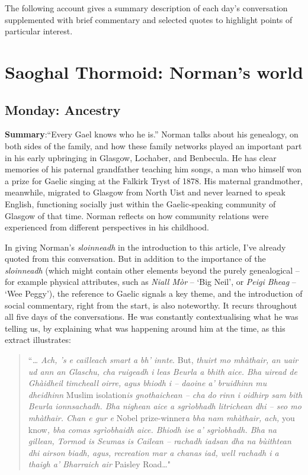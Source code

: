 \documentclass[output=paper,colorlinks,citecolor=brown]{langscibook}
\begin{document}
The following account gives a summary description of each day’s conversation supplemented with brief commentary and selected quotes to highlight points of particular interest. 


\section{Saoghal Thormoid: Norman’s world}


\subsection{Monday: Ancestry}

\textbf{Summary}:``Every Gael knows who he is.” Norman talks about his genealogy, on both sides of the family, and how these family networks played an important part in his early upbringing in Glasgow, Lochaber, and Benbecula. He has clear memories of his paternal grandfather teaching him songs, a man who himself won a prize for Gaelic singing at the Falkirk Tryst of 1878. His maternal grandmother, meanwhile, migrated to Glasgow from North Uist and never learned to speak English, functioning socially just within the Gaelic-speaking community of Glasgow of that time. Norman reflects on how community relations were experienced from different perspectives in his childhood.

In giving Norman’s \textit{sloinneadh} in the introduction to this article, I’ve already quoted from this conversation. But in addition to the importance of the \textit{sloinneadh} (which might contain other elements beyond the purely genealogical – for example physical attributes, such as \textit{Niall Mòr} – ‘Big Neil’, or \textit{Peigi Bheag} – ‘Wee Peggy’), the reference to Gaelic signals a key theme, and the introduction of social commentary, right from the start, is also noteworthy. It recurs throughout all five days of the conversations. He was constantly contextualising what he was telling us, by explaining what was happening around him at the time, as this extract illustrates:

\begin{quote}
``\textit{… Ach, ’s e cailleach smart a bh’ innte}. But, \textit{thuirt mo mhàthair, an uair ud ann an Glaschu, cha ruigeadh i leas Beurla a bhith aice. Bha uiread de Ghàidheil timcheall oirre, agus bhiodh i – daoine a’ bruidhinn mu dheidhinn} Muslim isolation\textit{is gnothaichean – cha do rinn i oidhirp sam bith Beurla ionnsachadh. Bha nighean aice a sgrìobhadh litrichean dhi – seo mo mhàthair. Chan e gur e} Nobel prize-winner\textit{a bha nam mhàthair, ach, }you know\textit{, bha comas sgrìobhaidh aice. Bhiodh ise a’ sgrìobhadh. Bha na gillean, Tormod is Seumas is Cailean – rachadh iadsan dha na bùithtean dhi airson biadh, agus, recreation mar a chanas iad, well rachadh i a thaigh a’ Bharraich air }Paisley Road…" 
\end{quote}
\end{document}
